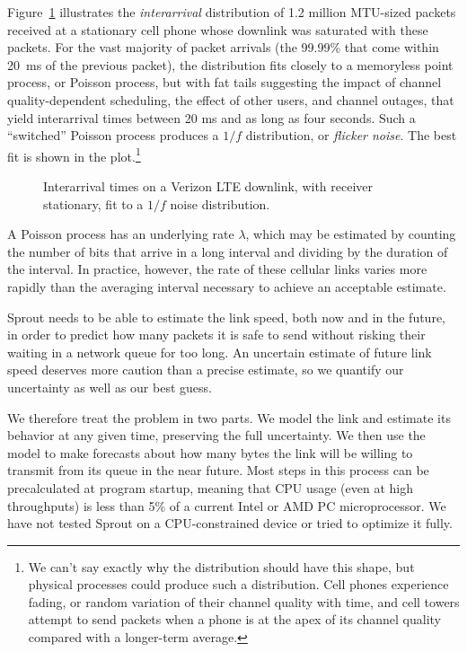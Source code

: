Figure~\ref{f:vzinter} illustrates the {\em interarrival} distribution
of 1.2 million MTU-sized packets received at a stationary cell phone
whose downlink was saturated with these packets. For the vast majority
of packet arrivals (the 99.99\% that come within 20~ms of the previous
packet), the distribution fits closely to a memoryless point process,
or Poisson process, but with fat tails suggesting the impact of
channel quality-dependent scheduling, the effect of other users, and
channel outages, that yield interarrival times between 20 ms and as
long as four seconds.  Such a ``switched'' Poisson process produces a
$1/f$ distribution, or {\em flicker noise}. The best fit is shown in
the plot.\footnote{We can't say exactly why the distribution should
  have this shape, but physical processes could produce such a
  distribution. Cell phones experience fading, or random variation of
  their channel quality with time, and cell towers attempt to send
  packets when a phone is at the apex of its channel quality compared
  with a longer-term average. }


\begin{figure}
\caption{Interarrival times on a Verizon LTE downlink, with receiver
  stationary, fit to a $1/f$ noise distribution.}

\hspace{\baselineskip}

\def\svgwidth{\columnwidth}

\label{f:vzinter}

\end{figure}

A Poisson process has an underlying rate $\lambda$, which may be
estimated by counting the number of bits that arrive in a long
interval and dividing by the duration of the interval. In practice,
however, the rate of these cellular links varies more rapidly than the
averaging interval necessary to achieve an acceptable estimate.

Sprout needs to be able to estimate the link speed, both now and in
the future, in order to predict how many packets it is safe to send
without risking their waiting in a network queue for too long. An
uncertain estimate of future link speed deserves more caution than a
precise estimate, so we quantify our uncertainty as well as
our best guess.

We therefore treat the problem in two parts. We model the link and
estimate its behavior at any given time, preserving the full
uncertainty. We then use the model to make forecasts about how many
bytes the link will be willing to transmit from its queue in the near
future. Most steps in this process can be precalculated at program
startup, meaning that CPU usage (even at high throughputs) is less
than 5\% of a current Intel or AMD PC microprocessor. We have not
tested Sprout on a CPU-constrained device or tried to optimize it
fully.

